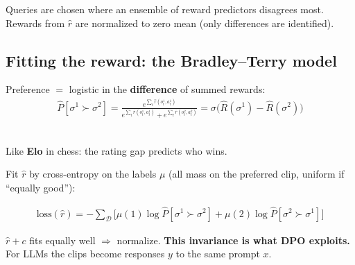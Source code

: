 {\small Queries are chosen where an ensemble of reward predictors disagrees most. Rewards from $\hat r$ are normalized to zero mean (only differences are identified).}

\subsection{Fitting the reward: the Bradley--Terry model}

\begin{minipage}[c]{0.55\linewidth}
Preference $=$ logistic in the \textbf{difference} of summed rewards:
\begin{gather*}
  \hat P[\sigma^1\succ\sigma^2]
  = \frac{e^{\sum_t\hat r(o_t^1,a_t^1)}}{e^{\sum_t\hat r(o_t^1,a_t^1)}+e^{\sum_t\hat r(o_t^2,a_t^2)}}
  = \sigma\big(\hat R(\sigma^1)-\hat R(\sigma^2)\big)
\end{gather*}
\end{minipage}\hfill
\begin{minipage}[c]{0.4\linewidth}
\centering
{}\\
{\scriptsize Like \textbf{Elo} in chess: the rating gap predicts who wins.}
\end{minipage}

Fit $\hat r$ by cross-entropy on the labels $\mu$ (all mass on the preferred clip, uniform if ``equally good''):
\begin{eqbox}
\begin{gather*}
  \mathrm{loss}(\hat r) = -\sum_{\mathcal D}\Big[\mu(1)\log\hat P[\sigma^1\succ\sigma^2] + \mu(2)\log\hat P[\sigma^2\succ\sigma^1]\Big]
\end{gather*}
\end{eqbox}

\begin{keybox}[title={Only differences matter}]
$\hat r+c$ fits equally well $\Rightarrow$ normalize. \textbf{This invariance is what DPO exploits.} For LLMs the clips become responses $y$ to the same prompt $x$.
\end{keybox}

